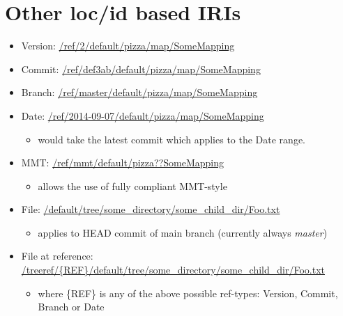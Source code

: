 \documentclass[a4paper,11pt,DIV=25]{scrartcl}
\begin{document}
\section{Other loc/id based IRIs}

\begin{itemize}
  \item Version: \url{/ref/2/default/pizza/map/SomeMapping}
  \item Commit: \url{/ref/def3ab/default/pizza/map/SomeMapping}
  \item Branch: \url{/ref/master/default/pizza/map/SomeMapping}
  \item Date: \url{/ref/2014-09-07/default/pizza/map/SomeMapping}
    \begin{itemize}
      \item would take the latest commit which applies to the Date range.
    \end{itemize}
  \item MMT: \url{/ref/mmt/default/pizza??SomeMapping}
    \begin{itemize}
      \item allows the use of fully compliant MMT-style
    \end{itemize}
  \item File: \url{/default/tree/some_directory/some_child_dir/Foo.txt}
    \begin{itemize}
      \item applies to HEAD commit of main branch (currently always \textit{master})
    \end{itemize}
  \item File at reference: \url{/treeref/{REF}/default/tree/some_directory/some_child_dir/Foo.txt}
    \begin{itemize}
      \item where \{REF\} is any of the above possible ref-types: Version, Commit, Branch or Date
    \end{itemize}
\end{itemize}
\end{document}

